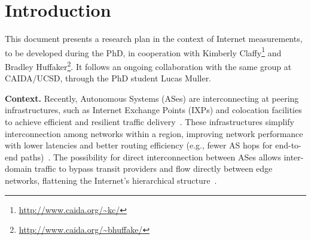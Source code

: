 \chapter{Introduction}\label{cap:introduction}
\thispagestyle{empty}

	This document presents a research plan in the context of Internet measurements, to be developed during the PhD, in cooperation with Kimberly Claffy\footnote{\url{http://www.caida.org/~kc/}} and Bradley Huffaker\footnote{\url{http://www.caida.org/~bhuffake/}}. It follows an ongoing collaboration with the same group at CAIDA/UCSD, through the PhD student Lucas Muller. 

	\textbf{Context.} Recently, Autonomous Systems (ASes) are interconnecting at peering infrastructures, such as Internet Exchange Points (IXPs) and colocation facilities~\cite{Giotsas:2015:MPI:2716281.2836122} to achieve efficient and resilient traffic delivery~\cite{Yap:2017:TEO:3098822.3098854, Schlinker:2017:EEE:3098822.3098853, marcos:2018:dynamix}. These infrastructures simplify interconnection among networks within a region, improving network performance with lower latencies and better routing efficiency (e.g., fewer AS hops for end-to-end paths)~\cite{Chatzis:2013}. The possibility for direct interconnection between ASes allows inter-domain traffic to bypass transit providers and flow directly between edge networks, flattening the Internet’s hierarchical structure~\cite{Labovitz:2010:IIT:1851182.1851194}.


